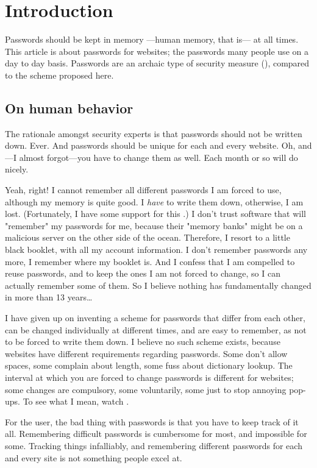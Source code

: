 \section{Introduction}
Passwords should be kept in memory%
---human memory, that is---%
at all times.
This article is about passwords for websites; the passwords many people use on a day to day basis.
Passwords are an archaic type of security measure
(\cite{Honan2012}),
compared to the scheme proposed here.
\subsection{On human behavior}
The rationale amongst security experts is that passwords should not be written down.
Ever.
And passwords should be unique for each and every website.
Oh, and---I almost forgot---you have to change them as well.
Each month or so will do nicely. 
\par
Yeah, right!
I cannot remember all different passwords I am forced to use, although my memory is quite good.
I \emph{have} to write them down, otherwise, I am lost.
(Fortunately, I have some support for this \cite{Schneier:2005}.)
I don't trust software that will "remember" my passwords for me, because their "memory banks" might be on a malicious server on the other side of the ocean.
Therefore, I resort to a little black booklet, with all my account information.
I don't remember passwords any more, I remember where my booklet is.
And I confess that I am compelled to reuse passwords, and to keep the ones I am not forced to change, so I can actually remember some of them.
So I believe nothing has fundamentally changed in more than 13 years\ldots\cite{Adams:1999:UE:322796.322806}
\par
I have given up on inventing a scheme for passwords that differ from each other,
can be changed individually at different times, 
and are easy to remember, as not to be forced to write them down.
I believe no such scheme exists, because websites have different requirements regarding passwords.
Some don't allow spaces, some complain about length, some fuss about dictionary lookup.
The interval at which you are forced to change passwords is different for websites;
some changes are compulsory, some voluntarily, some just to stop annoying pop-ups.
To see what I mean, watch \cite{youtube:tobyturner}.
\par
For the user, the bad thing with passwords is that you have to keep track of it all.
Remembering difficult passwords is cumbersome for most, and impossible for some.
Tracking things infalliably, and remembering different passwords for each and every site is not something people excel at.
